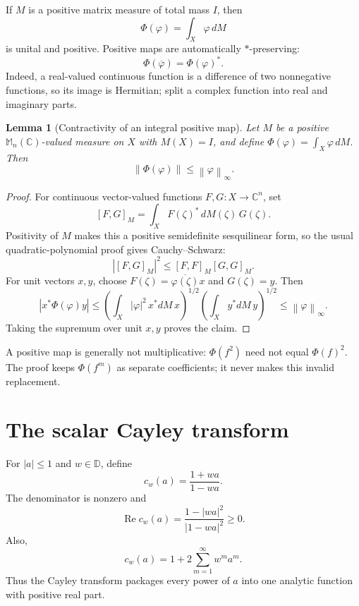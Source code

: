 \documentclass[11pt,oneside,openany]{book}
\newtheorem{lemma}[theorem]{Lemma}
\theoremstyle{definition}
\theoremstyle{remark}
\newcommand{\C}{\mathbb C}
\newcommand{\D}{\mathbb D}
\newcommand{\Mn}{\mathbb M_n(\C)}
\newcommand{\RePart}{\operatorname{Re}}
\newcommand{\norm}[1]{\left\lVert #1\right\rVert}
\begin{document}
If \(M\) is a positive matrix measure of total mass \(I\), then
\[
  \Phi(\varphi)=\int_X\varphi\,dM
\]
is unital and positive.  Positive maps are automatically
\(*\)-preserving:
\[
  \Phi(\overline\varphi)=\Phi(\varphi)^*.
\]
Indeed, a real-valued continuous function is a difference of two
nonnegative functions, so its image is Hermitian; split a complex
function into real and imaginary parts.

\begin{lemma}[Contractivity of an integral positive map]
\label{lem:positive-map-bounded}
Let \(M\) be a positive \(\Mn\)-valued measure on \(X\) with
\(M(X)=I\), and define
\(\Phi(\varphi)=\int_X\varphi\,dM\).  Then
\[
  \norm{\Phi(\varphi)}\leq\norm{\varphi}_\infty.
\]
\end{lemma}

\begin{proof}
For continuous vector-valued functions \(F,G:X\to\C^n\), set
\[
  [F,G]_M=\int_X F(\zeta)^*\,dM(\zeta)\,G(\zeta).
\]
Positivity of \(M\) makes this a positive semidefinite sesquilinear
form, so the usual quadratic-polynomial proof gives Cauchy--Schwarz:
\[
  |[F,G]_M|^2\leq[F,F]_M[G,G]_M.
\]
For unit vectors \(x,y\), choose
\(
F(\zeta)=\overline{\varphi(\zeta)}x
\)
and \(G(\zeta)=y\).  Then
\[
  |x^*\Phi(\varphi)y|
  \leq
  \left(\int_X|\varphi|^2\,x^*dM\,x\right)^{1/2}
  \left(\int_Xy^*dM\,y\right)^{1/2}
  \leq\norm{\varphi}_\infty.
\]
Taking the supremum over unit \(x,y\) proves the claim.
\end{proof}

\begin{pitfall}
A positive map is generally not multiplicative:
\(\Phi(f^2)\) need not equal \(\Phi(f)^2\).  The proof keeps
\(\Phi(f^m)\) as separate coefficients; it never makes this invalid
replacement.
\end{pitfall}

\section{The scalar Cayley transform}

For \(|a|\leq1\) and \(w\in\D\), define
\[
  c_w(a)=\frac{1+wa}{1-wa}.
\]
The denominator is nonzero and
\begin{equation}
  \RePart c_w(a)
  =\frac{1-|wa|^2}{|1-wa|^2}\geq0.
  \label{eq:cayley-real}
\end{equation}
Also,
\begin{equation}
  c_w(a)=1+2\sum_{m=1}^{\infty}w^ma^m.
  \label{eq:cayley-geometric}
\end{equation}
Thus the Cayley transform packages every power of \(a\) into one
analytic function with positive real part.
\end{document}
